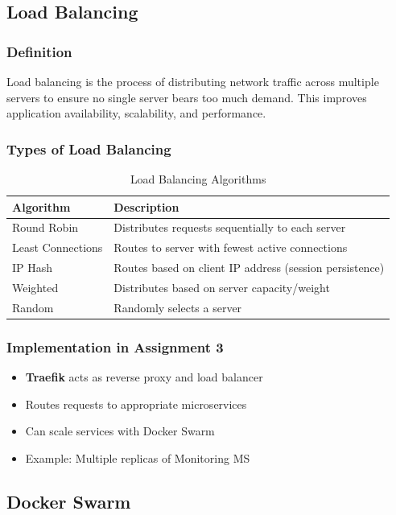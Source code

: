 \documentclass[12pt,a4paper]{article}
\begin{document}
\subsection{Load Balancing}

\subsubsection{Definition}
Load balancing is the process of distributing network traffic across multiple servers to ensure no single server bears too much demand. This improves application availability, scalability, and performance.

\subsubsection{Types of Load Balancing}
\begin{table}[H]
\centering
\begin{tabular}{|l|p{8cm}|}
\hline
\textbf{Algorithm} & \textbf{Description} \\
\hline
Round Robin & Distributes requests sequentially to each server \\
\hline
Least Connections & Routes to server with fewest active connections \\
\hline
IP Hash & Routes based on client IP address (session persistence) \\
\hline
Weighted & Distributes based on server capacity/weight \\
\hline
Random & Randomly selects a server \\
\hline
\end{tabular}
\caption{Load Balancing Algorithms}
\end{table}

\subsubsection{Implementation in Assignment 3}
\begin{itemize}
    \item \textbf{Traefik} acts as reverse proxy and load balancer
    \item Routes requests to appropriate microservices
    \item Can scale services with Docker Swarm
    \item Example: Multiple replicas of Monitoring MS
\end{itemize}

\subsection{Docker Swarm}
\end{document}
